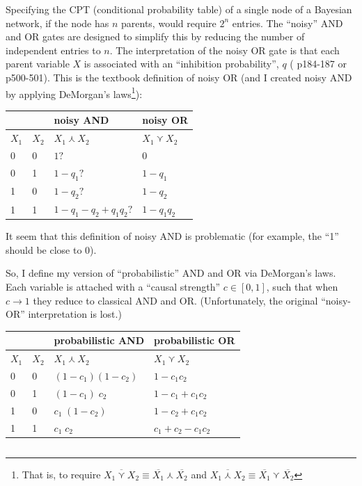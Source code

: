 Specifying the CPT (conditional probability table) of a single node of a Bayesian network, if the node has $n$ parents, would require $2^n$ entries.  The ``noisy'' AND and OR gates are designed to simplify this by reducing the number of independent entries to $n$.  The interpretation of the noisy OR gate is that each parent variable $X$ is associated with an ``inhibition probability'', $q$ (\citep*{Pearl1988} p184-187 or \citep*{Russell2003} p500-501).  This is the textbook definition of noisy OR (and I created noisy AND by applying DeMorgan's laws\footnote{That is, to require $\overline{X_1 \curlyvee X_2} \equiv \overline{X_1} \curlywedge \overline{X_2}$ and $\overline{X_1 \curlywedge X_2} \equiv \overline{X_1} \curlyvee \overline{X_2}$ }):

\hspace*{1cm} \begin{tabular}{|l|l||l||l|} \hline
\multicolumn{2}{|c||}{} & {\textbf{noisy AND}}           & {\textbf{noisy OR}}\\ \hline
$X_1$ & $X_2$           & $X_1 \curlywedge X_2$          & $ X_1 \curlyvee X_2 $\\ \hline
0     & 0               & $ 1 ? $                        & $ 0 $\\
0     & 1               & $ 1 - q_1 ? $                  & $ 1 - q_1 $\\
1     & 0               & $ 1 - q_2 ? $                  & $ 1 - q_2 $\\
1     & 1               & $ 1 - q_1 - q_2 + q_1 q_2 ? $  & $ 1 - q_1 q_2 $\\ \hline
\end{tabular}

It seem that this definition of noisy AND is problematic (for example, the ``1'' should be close to 0).

So, I define my version of ``probabilistic'' AND and OR via DeMorgan's laws.  Each variable is attached with a ``causal strength'' $c \in [0,1]$, such that when $c \rightarrow 1$ they reduce to classical AND and OR.  (Unfortunately, the original ``noisy-OR'' interpretation is lost.)

\hspace*{1cm} \begin{tabular}{|l|l||l||l|}
\hline
\multicolumn{2}{|c||}{} & {\textbf{probabilistic AND}} & {\textbf{probabilistic OR}}\\
\hline
$X_1$ & $X_2$ & $X_1 \curlywedge X_2$          & $X_1 \curlyvee X_2$\\ \hline
0     & 0     & $(1-c_1) (1-c_2)$              & $1 - c_1 c_2$\\
0     & 1     & $(1-c_1) \; c_2$               & $1 - c_1 + c_1 c_2$\\
1     & 0     & $c_1 \; (1-c_2)$               & $1 - c_2 + c_1 c_2$\\
1     & 1     & $c_1 \; c_2$                   & $c_1 + c_2 - c_1 c_2$\\
\hline
\end{tabular}
\parbox{5cm}{\begin{equation}
\label{eqn:probabilistic-AND-OR}
\end{equation}}

